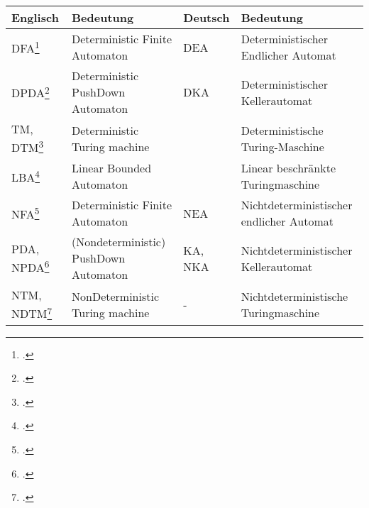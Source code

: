 \documentclass{lehramt-informatik-haupt}
\begin{document}
\noindent
\begin{tabularx}{\linewidth}{l|X||l|X}
Englisch & Bedeutung & Deutsch & Bedeutung \\\hline\hline

%

DFA\footcite{wiki:dfa} &
Deterministic Finite Automaton &
DEA &
Deterministischer Endlicher Automat\\

%

DPDA\footcite{wiki:dpda} &
Deterministic PushDown Automaton &
DKA &
Deterministischer Kellerautomat \\

%

TM, DTM\footcite{wiki:tm} &
Deterministic Turing machine &
&
Deterministische Turing-Maschine \\

%

LBA\footcite{wiki:lba} &
Linear Bounded Automaton &
&
Linear beschränkte Turingmaschine \\

%

NFA\footcite{wiki:nfa} &
Deterministic Finite Automaton &
NEA &
Nichtdeterministischer endlicher Automat\\

%

PDA, NPDA\footcite{wiki:pda} &
(Nondeterministic) PushDown Automaton &
KA, NKA &
Nichtdeterministischer Kellerautomat \\

%

NTM, NDTM\footcite{wiki:ntm} &
NonDeterministic Turing machine &
- &
Nichtdeterministische Turingmaschine\\
\end{tabularx}

\literatur
\end{document}
